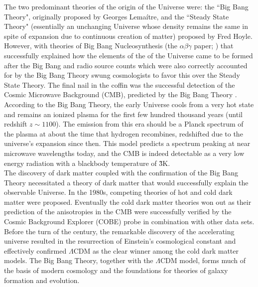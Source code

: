 The two predominant theories of the origin of the Universe were: the ``Big Bang Theory", originally proposed by Georges Lema{\'i}tre, and the ``Steady State Theory" (essentially an unchanging Universe whose density remains the same in spite of expansion due to continuous creation of matter) proposed by Fred Hoyle. However, with theories of Big Bang Nucleosynthesis (the $\alpha\beta\gamma$ paper; \citealt{alpher_origin_1948}) that successfully explained how the elements of the of the Universe came to be formed after the Big Bang and radio source counts which were also correctly accounted for by the Big Bang Theory swung cosmologists to favor this over the Steady State Theory. The final nail in the coffin was the successful detection of the Cosmic Microwave Background (CMB), predicted by the Big Bang Theory \citep{1965ApJ...142..419P}. According to the Big Bang Theory, the early Universe cools from a very hot state and remains an ionized plasma for the first few hundred thousand years (until redshift $z\sim 1100$). The emission from this era should be a Planck spectrum of the plasma at about the time that hydrogen recombines, redshifted due to the universe's expansion since then. This model predicts a spectrum peaking at near microwave wavelengths today, and the CMB is indeed detectable as a very low energy radiation with a blackbody temperature of \~ 3K.\\

The discovery of dark matter coupled with the confirmation of the Big Bang Theory necessitated a theory of dark matter that would successfully explain the observable Universe. In the 1980s, competing theories of hot and cold dark matter \citep{1985ApJ...292..371D} were proposed. Eventually the cold dark matter theories won out as their prediction of the anisotropies in the CMB \citep{peebles_large-scale_1982} were successfully verified by the Cosmic Background Explorer (COBE) probe \citep{smoot92a} in combination with other data sets.\\

Before the turn of the century, the remarkable discovery of the accelerating universe \citep{Riess:1998cb} resulted in the resurrection of Einstein's cosmological constant and effectively confirmed $\Lambda$CDM as the clear winner among the cold dark matter models. The Big Bang Theory, together with the $\Lambda$CDM model, forms much of the basis of modern cosmology and the foundations for theories of galaxy formation and evolution.\\

